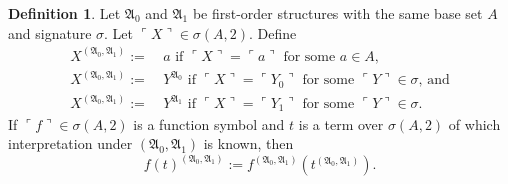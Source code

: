 \documentclass[12pt, twoside]{memoir}
\numberwithin{equation}{section}
\theoremstyle{definition}
\newtheorem{defi}[thm]{Definition}
\theoremstyle{remark}
\theoremstyle{definition}
\theoremstyle{definition}
\theoremstyle{definition}
\theoremstyle{remark}
\begin{document}
\begin{defi}
Let $\mathfrak{A}_0$ and $\mathfrak{A}_1$ be first-order structures with the same base set $A$ and signature $\sigma$. Let $\ulcorner X \urcorner \in \sigma(A, 2)$.
Define
\begin{align*}
    X^{(\mathfrak{A}_0, \mathfrak{A}_1)} := \ & a \text{ if } \ulcorner X \urcorner = \ulcorner a \urcorner \text{ for some } a \in A \text{,} \\
    X^{(\mathfrak{A}_0, \mathfrak{A}_1)} := \ & Y^{\mathfrak{A}_0} \text{ if } \ulcorner X \urcorner = \ulcorner Y_0 \urcorner \text{ for some } \ulcorner Y \urcorner \in \sigma \text{, and} \\
    X^{(\mathfrak{A}_0, \mathfrak{A}_1)} := \ & Y^{\mathfrak{A}_1} \text{ if } \ulcorner X \urcorner = \ulcorner Y_1 \urcorner \text{ for some } \ulcorner Y \urcorner \in \sigma \text{.}
\end{align*}
If $\ulcorner f \urcorner \in \sigma(A, 2)$ is a function symbol and $t$ is a term over $\sigma(A, 2)$ of which interpretation under $(\mathfrak{A}_0, \mathfrak{A}_1)$ is known, then 
\begin{equation*}
    f(t)^{(\mathfrak{A}_0, \mathfrak{A}_1)} := f^{(\mathfrak{A}_0, \mathfrak{A}_1)}(t^{(\mathfrak{A}_0, \mathfrak{A}_1)}) \text{.}
\end{equation*}
\end{defi}
\end{document}

